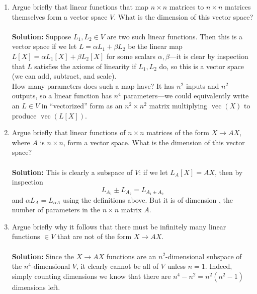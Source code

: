 \documentclass{article}
\newcommand{\vecm}{\operatorname{vec}}
\begin{document}
\begin{enumerate}[label=(\alph*)]

\item
Argue briefly that linear functions that map $n \times n$ matrices to $n \times n$ matrices themselves form
a vector space $V$.  What is the dimension of this vector space?
\\
\\
\textbf{Solution:} Suppose $L_1,L_2 \in V$ are two such linear functions.  Then this is a vector space if we let $L= \alpha L_1 + \beta L_2$ be the linear map $L[X] = \alpha L_1[X] + \beta L_2[X]$ for some scalars $\alpha,\beta$---it is clear by inspection that $L$  satisfies the axioms of linearity if $L_1,L_2$ do, so this is a vector space (we can add, subtract, and scale).
\\
How many parameters does such a map have?  It has $n^2$ inputs and $n^2$ outputs, so a linear function has $\boxed{n^4}$ parameters---we could equivalently write an $L \in V$ in ``vectorized'' form as an $n^2 \times n^2$ matrix multiplying $\vecm(X)$ to produce $\vecm(L[X])$.
\\

\item
Argue briefly that linear functions of 
$n \times n$ matrices of the form $ X \rightarrow AX$, where $A$ is $n \times n$,  form a vector space.
What is the dimension of this vector space?
\\
\\
\textbf{Solution:} This is clearly a subspace of $V$: if we let $L_A[X] = AX$, then by inspection $$L_{A_1} \pm L_{A_2} = L_{A_1\pm A_2}$$ and $\alpha L_A = L_{\alpha A}$ using the definitions above.  But it is of dimension , the number of parameters in the $n \times n$ matrix $A$.

\item
Argue briefly why it follows that there must be infinitely many linear functions $\in V$
that are not of the form $X \rightarrow AX$.
\\
\\
\textbf{Solution:} Since the $X \rightarrow AX$ functions are an $n^2$-dimensional subspace of the $n^4$-dimensional $V$, it clearly cannot be all of $V$ unless $n=1$.  Indeed, simply counting dimensions we know that there are $n^4 - n^2 = n^2 (n^2 - 1)$ dimensions left. 

\end{enumerate}
\end{document}
